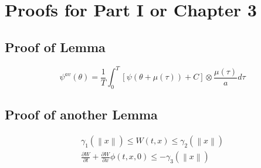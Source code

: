 
\chapter{Proofs for Part I or Chapter 3} %

\label{AppendixA} %

\section{Proof of Lemma}
\label{pf:ApprGradSys}

$$\psi^{av}(\theta)=\frac{1}{T}\int^{T}_0[\psi(\theta+\mu(\tau))+C]\otimes\frac{\mu(\tau)}{a}d\tau$$ 



\section{Proof of another Lemma}
\begin{equation}
\begin{aligned}
\gamma_1(\left\|x\right\|)\leq W(t,x)\leq \gamma_2(\left\|x\right\|)\\
\frac{\partial{W}}{\partial{t}}+\frac{\partial{W}}{\partial{x}}\phi(t,x,0)\leq-\gamma_3(\left\|x\right\|)
\end{aligned}
\end{equation}
